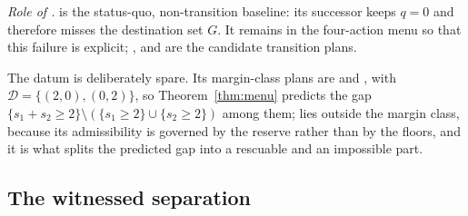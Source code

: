 \noindent\textit{Role of .}  is the status-quo, non-transition baseline: its successor keeps $q=0$ and therefore misses the destination set $G$. It remains in the four-action menu so that this failure is explicit; ,  and  are the candidate transition plans.

The datum is deliberately spare. Its margin-class plans are  and , with $\mathcal D=\{(2,0),(0,2)\}$, so Theorem~\ref{thm:menu} predicts the gap $\{s_1+s_2\ge2\}\setminus(\{s_1\ge2\}\cup\{s_2\ge2\})$ among them;  lies outside the margin class, because its admissibility is governed by the reserve rather than by the floors, and it is what splits the predicted gap into a rescuable and an impossible part.

\subsection{The witnessed separation}

